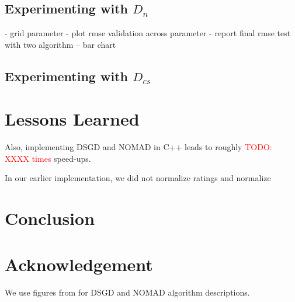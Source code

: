 \documentclass{article} %
\newcommand{\todo}[1]{\textcolor{red}{TODO: #1}}
\begin{document}
\subsection{Experimenting with $D_n$}

- grid parameter
- plot rmse validation across parameter
- report final rmse test with two algorithm -- bar chart

\subsection{Experimenting with $D_{cs}$}



\section{Lessons Learned}

Also, implementing DSGD and NOMAD in C++ leads to roughly \todo{XXXX times} speed-ups.

In our earlier implementation, we did not normalize ratings and normalize

\section{Conclusion}

\section{Acknowledgement}
We use figures from \cite{yun2013nomad} for DSGD and NOMAD algorithm descriptions.


{}
\end{document}
